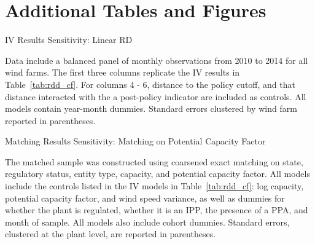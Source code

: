 \documentclass[12pt]{article}
\begin{document}
\clearpage
\section{Additional Tables and Figures}
\setcounter{figure}{0}  \renewcommand{\thefigure}{D.\arabic{figure}} 
\setcounter{table}{0}  \renewcommand{\thetable}{D.\arabic{table}} 


\begin{table}[H]
\caption{IV Results Sensitivity: Linear RD \label{tab:rdd_cf_linear}}
\begin{center}{\footnotesize{}}\end{center}
\footnotesize
Data include a balanced panel of monthly observations from 2010 to 2014 for all wind farms. The first three columns replicate the IV results in Table~\ref{tab:rdd_cf}. For columns 4 - 6, distance to the policy cutoff, and that distance interacted with the a post-policy indicator are included as controls. All models contain year-month dummies. Standard errors clustered by wind farm reported in parentheses.
\end{table}


\begin{table}[h]
\begin{centering}
\caption{Matching Results Sensitivity: Matching on Potential Capacity Factor \label{tab:matching_group_ptnlcf}}

\par\end{centering}
\footnotesize

The matched sample was constructed using coarsened exact matching on state, regulatory status, entity type, capacity, and potential capacity factor. All models include the controls listed in the IV models in Table~\ref{tab:rdd_cf}: log capacity, potential capacity factor, and wind speed variance, as well as dummies for whether the plant is regulated, whether it is an IPP, the presence of a PPA, and month of sample. All models also include cohort dummies. Standard errors, clustered at the plant level, are reported in parentheses.
\end{table}
\end{document}

